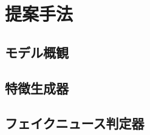 %
\chapter{提案手法}
%
\section{モデル概観}
% 

%
\section{特徴生成器}
%

%
\section{フェイクニュース判定器}
%




%
%
\newpage
%
%
%
%
%
%
%
%
%
%
% 